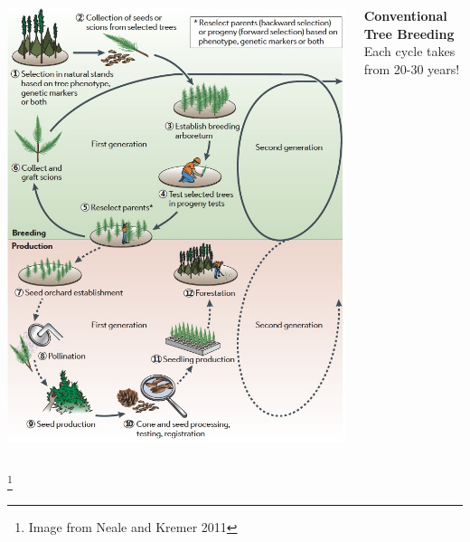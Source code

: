 \documentclass[xcolor=dvipsnames]{beamer}
\newcommand\blfootnote[1]{%
	\begingroup
	\renewcommand\thefootnote{}\footnote{#1}%
	\addtocounter{footnote}{-1}%
	\endgroup
}
\begin{document}
\begin{frame}
\begin{columns}
	\begin{column}{0.6\textwidth}
		\centering 	\includegraphics[keepaspectratio, width  = \textwidth]{img/treeImprovement}
	\end{column}
	\begin{column}{0.4\textwidth}
		\textbf{Conventional Tree Breeding\\}
		\pause
		Each cycle takes from 20-30 years!
	\end{column}
\end{columns}
\blfootnote{Image from Neale and Kremer 2011}
\end{frame}
\end{document}
